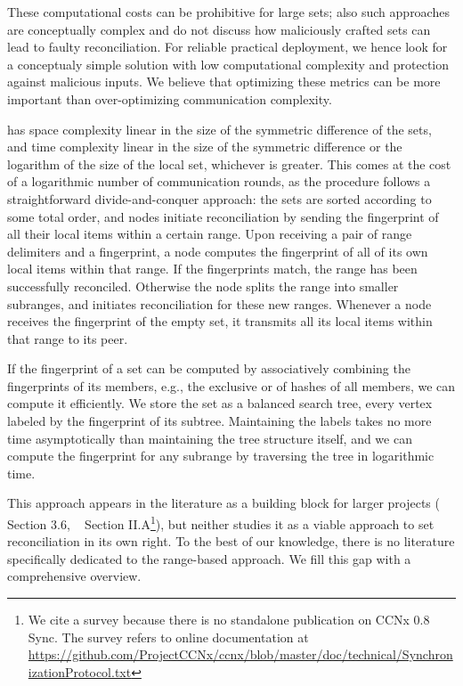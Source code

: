 \documentclass[conference]{IEEEtran}
\begin{document}
These computational costs can be prohibitive for large sets; also such approaches are conceptually complex and do not discuss how maliciously crafted sets can lead to faulty reconciliation. For reliable practical deployment, we hence look for a conceptualy simple solution with low computational complexity and protection against malicious inputs. We believe that optimizing these metrics can be more important than over-optimizing communication complexity.

 has space complexity linear in the size of the symmetric difference of the sets, and time complexity linear in the size of the symmetric difference or the logarithm of the size of the local set, whichever is greater. This comes at the cost of a logarithmic number of communication rounds, as the procedure follows a straightforward divide-and-conquer approach: the sets are sorted according to some total order, and nodes initiate reconciliation by sending the fingerprint of all their local items within a certain range. Upon receiving a pair of range delimiters and a fingerprint, a node computes the fingerprint of all of its own local items within that range. If the fingerprints match, the range has been successfully reconciled. Otherwise the node splits the range into smaller subranges, and initiates reconciliation for these new ranges. Whenever a node receives the fingerprint of the empty set, it transmits all its local items within that range to its peer.

If the fingerprint of a set can be computed by associatively combining the fingerprints of its members, e.g., the exclusive or of hashes of all members, we can compute it efficiently. We store the set as a balanced search tree, every vertex labeled by the fingerprint of its subtree. Maintaining the labels takes no more time asymptotically than maintaining the tree structure itself, and we can compute the fingerprint for any subrange by traversing the tree in logarithmic time.

This approach appears in the literature as a building block for larger projects (\cite{chen1999prototype} Section 3.6, ~\cite{shang2017survey} Section II.A\footnote{We cite a survey because there is no standalone publication on CCNx 0.8 Sync. The survey refers to online documentation at \url{https://github.com/ProjectCCNx/ccnx/blob/master/doc/technical/SynchronizationProtocol.txt}}), but neither studies it as a viable approach to set reconciliation in its own right. To the best of our knowledge, there is no literature specifically dedicated to the range-based approach. We fill this gap with a comprehensive overview.
\end{document}
